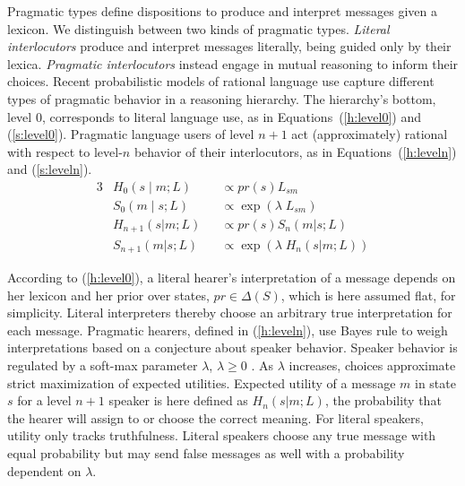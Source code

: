 \documentclass[a4paper, 11pt]{article}
\theoremstyle{Satz}
\newcommand{\state}{\ensuremath{s}\xspace}		%
\newcommand{\messg}{\ensuremath{m}\xspace}		%
\begin{document}
Pragmatic types define dispositions to produce and interpret messages given a lexicon. We
distinguish between two kinds of pragmatic types. {\em Literal interlocutors} produce and
interpret messages literally, being guided only by their lexica. {\em Pragmatic interlocutors}
instead engage in mutual reasoning to inform their choices. Recent probabilistic models of
rational language use
\citep{frank+goodman:2012,FrankeJager2015:Probabilistic-p,GoodmanFrank2016:Pragmatic-Langu}
capture different types of pragmatic behavior in a reasoning hierarchy. The hierarchy's bottom,
level $0$, corresponds to literal language use, as in Equations~(\ref{h:level0}) and
(\ref{s:level0}). Pragmatic language users of level $n + 1$ act (approximately) rational with
respect to level-$n$ behavior of their interlocutors, as in Equations~(\ref{h:leveln}) and
(\ref{s:leveln}).
\begin{alignat}{3}
&H_{0}(s \mid m;L) &&\propto pr(s) L_{sm} \label{h:level0}\\
&S_{0}(m \mid s;L) &&\propto \exp(\lambda \; L_{sm}) \label{s:level0}\\
&H_{n+1}(s|m;L) &&\propto pr(s) S_{n}(m|s;L) \label{h:leveln}\\
&S_{n+1}(m|s;L) &&\propto  \exp(\lambda \; H_{n}(s|m;L)) \label{s:leveln}
\end{alignat}

According to (\ref{h:level0}), a literal hearer's interpretation of a message depends on her
lexicon and her prior over states, $pr \in \Delta(S)$, which is here assumed flat, for
simplicity. Literal interpreters thereby choose an arbitrary true interpretation for each
message. Pragmatic hearers, defined in (\ref{h:leveln}), use Bayes rule to weigh
interpretations based on a conjecture about speaker behavior. Speaker behavior is regulated by
a soft-max parameter $\lambda$, $\lambda \geq 0$ \citep{luce:1959,sutton+barto:1998}. As
$\lambda$ increases, choices approximate strict maximization of expected utilities. Expected
utility of a message $\messg$ in state $\state$ for a level $n+1$ speaker is here defined as
$H_{n}(s|m;L)$, the probability that the hearer will assign to or choose the correct
meaning. For literal speakers, utility only tracks truthfulness. Literal speakers choose any
true message with equal probability but may send false messages as well with a probability
dependent on $\lambda$.
\end{document}
